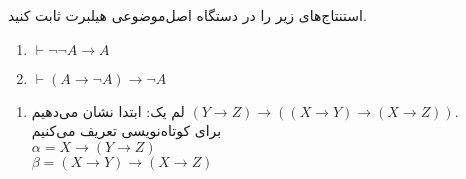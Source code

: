 استنتاج‌های زیر را در دستگاه اصل‌موضوعی هیلبرت ثابت کنید.

\begin{enumerate}
\item
$\vdash \neg\neg A\to A$

\item
$\vdash (A\to\neg A)\to \neg A$
\end{enumerate}\quad
\begin{ans}
  \begin{enumerate}
    \item لم یک: ابتدا نشان می‌دهیم
    $(Y \rightarrow Z) \rightarrow ((X \rightarrow Y) \rightarrow (X \rightarrow Z))$.
    \\ برای کوتاه‌نویسی تعریف می‌کنیم\\
    {\LTR \footnotesize
    $\alpha = X \rightarrow (Y \rightarrow Z)$\\
    $\beta = (X \rightarrow Y) \rightarrow (X \rightarrow Z)$\\

}
\end{enumerate}
\end{ans}
